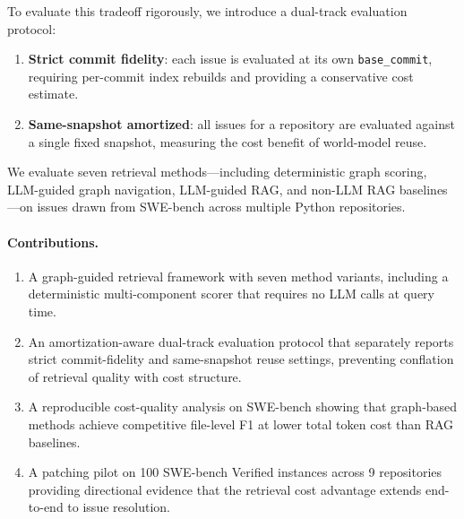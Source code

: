 To evaluate this tradeoff rigorously, we introduce a dual-track evaluation protocol:
\begin{enumerate}[leftmargin=1.5em]
  \item \textbf{Strict commit fidelity}: each issue is evaluated at its own \texttt{base\_commit}, requiring per-commit index rebuilds and providing a conservative cost estimate.
  \item \textbf{Same-snapshot amortized}: all issues for a repository are evaluated against a single fixed snapshot, measuring the cost benefit of world-model reuse.
\end{enumerate}

We evaluate seven retrieval methods---including deterministic graph scoring, LLM-guided graph navigation, LLM-guided RAG, and non-LLM RAG baselines---on issues drawn from SWE-bench \citep{swebench2024} across multiple Python repositories.

\paragraph{Contributions.}
\begin{enumerate}[leftmargin=1.5em]
  \item A graph-guided retrieval framework with seven method variants, including a deterministic multi-component scorer that requires no LLM calls at query time.
  \item An amortization-aware dual-track evaluation protocol that separately reports strict commit-fidelity and same-snapshot reuse settings, preventing conflation of retrieval quality with cost structure.
  \item A reproducible cost-quality analysis on SWE-bench showing that graph-based methods achieve competitive file-level F1 at lower total token cost than RAG baselines.
  \item A patching pilot on 100 SWE-bench Verified instances across 9 repositories providing directional evidence that the retrieval cost advantage extends end-to-end to issue resolution.
\end{enumerate}
